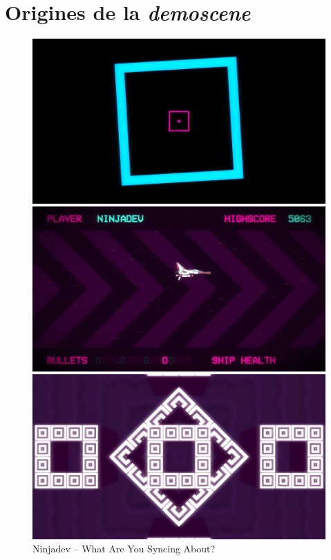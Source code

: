 \section{Origines de la \textit{demoscene}}
\begin{figure}[h]
  \begin{minipage}[b]{0.30\linewidth}
    \centering
    \includegraphics[width=\linewidth]{images/demoscene/demos/ninja1.png}
  \end{minipage}
  \hfill
  \begin{minipage}[b]{0.30\linewidth}
    \centering
    \includegraphics[width=\linewidth]{images/demoscene/demos/ninja2.png}
  \end{minipage}
  \hfill
  \begin{minipage}[b]{0.30\linewidth}
    \centering
    \includegraphics[width=\linewidth]{images/demoscene/demos/ninja3.png}
  \end{minipage}
  \caption{Ninjadev – What Are You Syncing About?}
  \label{ninja}
\end{figure}




